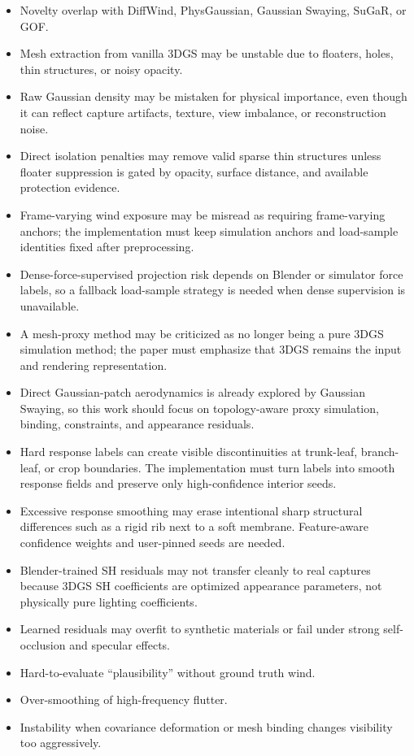 \documentclass[11pt]{article}
\begin{document}
\begin{itemize}
  \item Novelty overlap with DiffWind, PhysGaussian, Gaussian Swaying, SuGaR, or GOF.
  \item Mesh extraction from vanilla 3DGS may be unstable due to floaters, holes, thin structures, or noisy opacity.
  \item Raw Gaussian density may be mistaken for physical importance, even though it can reflect capture artifacts, texture, view imbalance, or reconstruction noise.
  \item Direct isolation penalties may remove valid sparse thin structures unless floater suppression is gated by opacity, surface distance, and available protection evidence.
  \item Frame-varying wind exposure may be misread as requiring frame-varying anchors; the implementation must keep simulation anchors and load-sample identities fixed after preprocessing.
  \item Dense-force-supervised projection risk depends on Blender or simulator force labels, so a fallback load-sample strategy is needed when dense supervision is unavailable.
  \item A mesh-proxy method may be criticized as no longer being a pure 3DGS simulation method; the paper must emphasize that 3DGS remains the input and rendering representation.
  \item Direct Gaussian-patch aerodynamics is already explored by Gaussian Swaying, so this work should focus on topology-aware proxy simulation, binding, constraints, and appearance residuals.
  \item Hard response labels can create visible discontinuities at trunk-leaf, branch-leaf, or crop boundaries. The implementation must turn labels into smooth response fields and preserve only high-confidence interior seeds.
  \item Excessive response smoothing may erase intentional sharp structural differences such as a rigid rib next to a soft membrane. Feature-aware confidence weights and user-pinned seeds are needed.
  \item Blender-trained SH residuals may not transfer cleanly to real captures because 3DGS SH coefficients are optimized appearance parameters, not physically pure lighting coefficients.
  \item Learned residuals may overfit to synthetic materials or fail under strong self-occlusion and specular effects.
  \item Hard-to-evaluate ``plausibility'' without ground truth wind.
  \item Over-smoothing of high-frequency flutter.
  \item Instability when covariance deformation or mesh binding changes visibility too aggressively.
\end{itemize}
\end{document}
